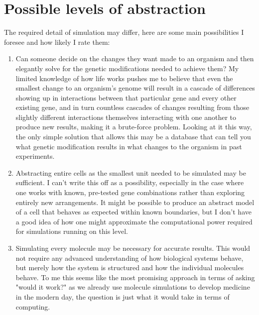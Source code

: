 \documentclass[a4paper]{article}
\begin{document}
	\tableofcontents
	
	\pagebreak
	
	\section{Possible levels of abstraction}
	
	The required detail of simulation may differ, here are some main possibilities I foresee and how likely I rate them:
	
	\begin{enumerate}
		\item Can someone decide on the changes they want made to an organism and then elegantly solve for the genetic modifications needed to achieve them? My limited knowledge of how life works pushes me to believe that even the smallest change to an organism's genome will result in a cascade of differences showing up in interactions between that particular gene and every other existing gene, and in turn countless cascades of changes resulting from those slightly different interactions themselves interacting with one another to produce new results, making it a brute-force problem. Looking at it this way, the only simple solution that allows this may be a database that can tell you what genetic modification results in what changes to the organism in past experiments.
		
		\item Abstracting entire cells as the smallest unit needed to be simulated may be sufficient. I can't write this off as a possibility, especially in the case where one works with known, pre-tested gene combinations rather than exploring entirely new arrangements. It might be possible to produce an abstract model of a cell that behaves as expected within known boundaries, but I don't have a good idea of how one might approximate the computational power required for simulations running on this level.
		
		\item Simulating every molecule may be necessary for accurate results. This would not require any advanced understanding of how biological systems behave, but merely how the system is structured and how the individual molecules behave. To me this seems like the most promising approach in terms of asking "would it work?" as we already use molecule simulations to develop medicine in the modern day, the question is just what it would take in terms of computing.
		

\end{enumerate}
\end{document}
